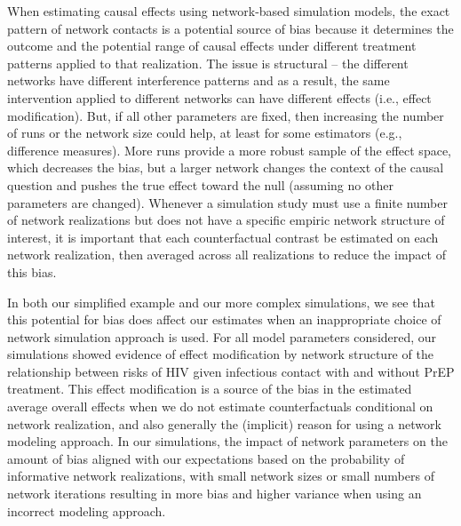 \documentclass{article}
\theoremstyle{definition}
\begin{document}
 When estimating causal effects using network-based simulation models, the exact pattern of network contacts is a potential source of bias because it determines the outcome and the potential range of causal effects under different treatment patterns applied to  that realization. The issue is structural -- the different networks have different interference patterns and as a result, the same intervention applied to different networks can have different effects (i.e., effect modification). But, if all other parameters are fixed, then increasing the number of runs or the network size could help, at least for some estimators (e.g., difference measures). More runs provide a more robust sample of the effect space, which decreases the bias, but a larger network changes the context of the causal question and pushes the true effect toward the null (assuming no other parameters are changed). Whenever a simulation study must use a finite number of network realizations but does not have a specific empiric network structure of interest, it is important that each counterfactual contrast be estimated on each network realization, then averaged across all realizations to reduce the impact of this bias. 

 In both our simplified example and our more complex simulations, we see that this potential for bias does affect our estimates when an inappropriate choice of network simulation approach is used.  For all model parameters considered, our simulations showed evidence of effect modification by network structure of the relationship between risks of HIV given infectious contact with and without PrEP treatment. This effect modification is a source of the bias in the estimated average overall effects when we do not estimate counterfactuals conditional on network realization, and also generally the (implicit) reason for using a network modeling approach. In our simulations, the impact of network parameters on the amount of bias aligned with our expectations based on the probability of informative network realizations, with small network sizes or small numbers of network iterations resulting in more bias and higher variance when using an incorrect modeling approach.
\end{document}
